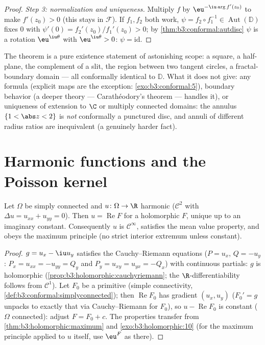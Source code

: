 \begin{proof}
\emph{Step 3: normalization and uniqueness.} Multiply $f$ by
$\eu^{-\iu\arg f'(z_0)}$ to make $f'(z_0) > 0$ (this stays in
$\mathcal F$). If $f_1, f_2$ both work, $\psi =
f_2\circ f_1^{-1} \in \operatorname{Aut}(\mathbb D)$ fixes
$0$ with $\psi'(0) = f_2'(z_0)/f_1'(z_0) > 0$; by
\cref{thm:b3:conformal:autdisc} $\psi$ is a rotation
$\eu^{\iu\theta}$ with $\eu^{\iu\theta} > 0$: $\psi =
\mathrm{id}$.
\end{proof}

\begin{remark}\label{rem:b3:conformal:rmtscope}
The theorem is a pure existence statement of astonishing
scope: a square, a half-plane, the complement of a slit, the
region between two tangent circles, a fractal-boundary domain
--- all conformally identical to $\mathbb D$. What it does not
give: any formula (explicit maps are the exception:
\cref{exo:b3:conformal:5}), boundary behavior (a deeper theory
--- Carath\'eodory's theorem --- handles it), or uniqueness
of extension to $\C$ or multiply connected domains: the
annulus $\{1 < \abs z < 2\}$ is \emph{not} conformally a
punctured disc, and annuli of different radius ratios are
inequivalent (a genuinely harder fact).
\end{remark}

\section{Harmonic functions and the Poisson kernel}

\begin{proposition}\label{prop:b3:conformal:harmonicholo}
Let $\Omega$ be simply connected and $u \colon \Omega \to \R$
harmonic ($\mathcal C^2$ with
$\Delta u = u_{xx} + u_{yy} = 0$). Then $u =
\operatorname{Re}F$ for a holomorphic $F$, unique up to an
imaginary constant. Consequently $u$ is $\mathcal C^\infty$,
satisfies the mean value property, and obeys the maximum
principle (no strict interior extremum unless constant).
\end{proposition}

\begin{proof}
$g = u_x - \iu u_y$ satisfies the Cauchy--Riemann equations
($P = u_x$, $Q = -u_y$: $P_x = u_{xx} = -u_{yy} = Q_y$ and
$P_y = u_{xy} = u_{yx} = -Q_x$) with continuous partials: $g$
is holomorphic (\cref{prop:b3:holomorphic:cauchyriemann}; the
$\R$-differentiability follows from $\mathcal C^1$). Let $F_0$
be a primitive (simple connectivity,
\cref{def:b3:conformal:simplyconnected}); then
$\operatorname{Re}F_0$ has gradient $(u_x, u_y)$
($F_0' = g$ unpacks to exactly that via Cauchy--Riemann for
$F_0$), so $u - \operatorname{Re}F_0$ is constant ($\Omega$
connected): adjust $F = F_0 + c$. The properties transfer
from \cref{thm:b3:holomorphic:maximum} and
\cref{exo:b3:holomorphic:10} (for the maximum principle
applied to $u$ itself, use $\eu^{F}$ as there).
\end{proof}


